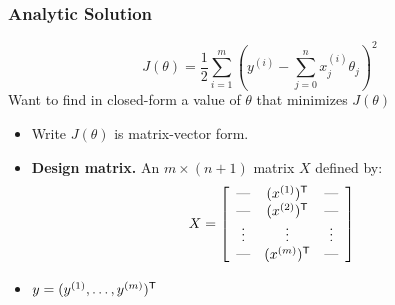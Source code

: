 \documentclass[xcolor=table]{beamer}
\newcommand{\trans}[1]{\ensuremath{#1}^{\scriptsize{\textsf{T}}}}
\begin{document}
\begin{frame}[t]
\frametitle{Analytic Solution}
\[J(\theta) = 
    \frac{1}{2} \sum_{i = 1}^{m} \left (y^{(i)} - \sum_{j = 0}^{n} x^{(i)}_j \theta_j \right )^2\]  
Want to find in closed-form a value of $\theta$ that minimizes $J(\theta)$ 

\begin{itemize}
    \item Write $J(\theta)$ is matrix-vector form.
    
    \pause

    \item \textbf{Design matrix.} An $m \times (n + 1)$ matrix $X$ defined by:
    \[
        X = \left [ \begin{array}{ccc}
                        \hbox{---} & \trans{(x^{(1)})} & \hbox{---} \\
                        \hbox{---} & \trans{(x^{(2)})} & \hbox{---} \\
                        \vdots     & \vdots                   & \vdots     \\
                        \hbox{---} & \trans{(x^{(m)})} & \hbox{---} \\
                   \end{array}
            \right ]
    \]

    \pause

    \item $y = \trans{(y^{(1)}, \ldots, y^{(m)})}$
\end{itemize}
\end{frame}
\end{document}
